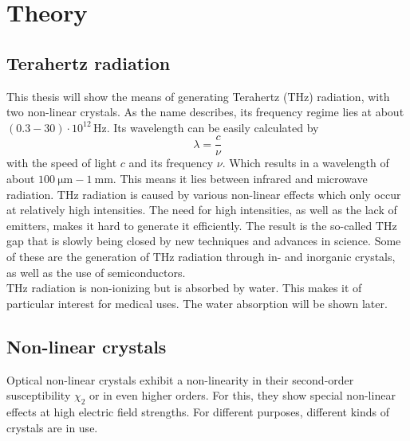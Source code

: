 \chapter{Theory}
\section{Terahertz radiation}
This thesis will show the means of generating Terahertz ($\si{\tera\hertz}$) radiation, with two non-linear crystals.
As the name describes, its frequency regime lies at about $(0.3-30)\cdot10^{12}\,\si{\hertz}$.
Its wavelength can be easily calculated by
\begin{equation}
    \lambda = \frac{c}{\nu}
\end{equation}
with the speed of light $c$ and its frequency $\nu$.
Which results in a wavelength of about $\SI{100}{\micro\meter}-\SI{1}{\milli\meter}$.
This means it lies between infrared and microwave radiation.
$\si{\tera\hertz}$ radiation is caused by various non-linear effects which only occur at relatively high intensities.
The need for high intensities, as well as the lack of emitters, makes it hard to generate it efficiently.
The result is the so-called $\si{\tera\hertz}$ gap that is slowly being closed by new techniques and advances in science.
Some of these are the generation of $\si{\tera\hertz}$ radiation through in- and inorganic crystals, as well as the use of semiconductors.
\\
$\si{\tera\hertz}$ radiation is non-ionizing but is absorbed by water.
This makes it of particular interest for medical uses.
The water absorption will be shown later. 


\section{Non-linear crystals}
Optical non-linear crystals exhibit a non-linearity in their second-order susceptibility $\chi_2$ or in even higher orders.
For this, they show special non-linear effects at high electric field strengths.
For different purposes, different kinds of crystals are in use.

